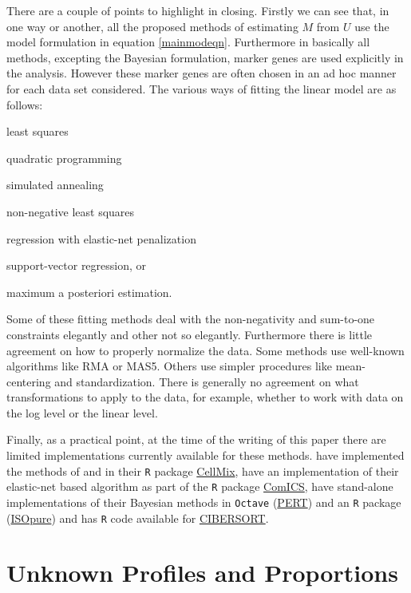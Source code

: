\documentclass[reqno,12pt,oneside]{report}\usepackage[]{graphicx}\usepackage[]{color}
\theoremstyle{plain}
\theoremstyle{definition}
\theoremstyle{remark}
\numberwithin{theorem}{chapter}     %
\begin{document}
There are a couple of points to highlight in closing. Firstly we can see that, in one way or another, all the proposed methods of estimating $M$ from $U$ use the model formulation in equation \ref{mainmodeqn}. Furthermore in basically all methods, excepting the Bayesian formulation, marker genes are used explicitly in the analysis. However these marker genes are often chosen in an ad hoc manner for each data set considered. The various ways of fitting the linear model are as follows:
\begin{enumerate*}[label=(\arabic*)]
\item least squares
\item quadratic programming
\item simulated annealing
\item non-negative least squares
\item regression with elastic-net penalization
\item support-vector regression, or 
\item maximum a posteriori estimation.
\end{enumerate*}
Some of these fitting methods deal with the non-negativity and sum-to-one constraints elegantly and other not so elegantly. Furthermore there is little agreement on how to properly normalize the data. Some methods use well-known algorithms like RMA or MAS5. Others use simpler procedures like mean-centering and standardization. There is generally no agreement on what transformations to apply to the data, for example, whether to work with data on the log level or the linear level.

Finally, as a practical point, at the time of the writing of this paper there are limited implementations currently available for these methods. \citeauthor{Gaujoux2013} have implemented the methods of \citeauthor{Abbas2009} and \citeauthor{Gong2011} in their \verb+R+ package \href{http://web.cbio.uct.ac.za/~renaud/CRAN/web/CellMix/}{CellMix}, \citeauthor{Altboum2014} have an implementation of their elastic-net based algorithm as part of the \verb+R+ package \href{https://cran.r-project.org/web/packages/ComICS/index.html}{ComICS}, \citeauthor{Qiao2012} have stand-alone implementations of their Bayesian methods in \verb+Octave+ (\href{https://github.com/gquon/PERT}{PERT}) and an \verb+R+ package (\href{https://cran.r-project.org/web/packages/ISOpureR/index.html}{ISOpure}) and \citeauthor{Newman2015} has \verb+R+ code available for \href{https://cibersort.stanford.edu/}{CIBERSORT}.

\section{Unknown Profiles and Proportions}
\label{litrev:full}
\end{document}
